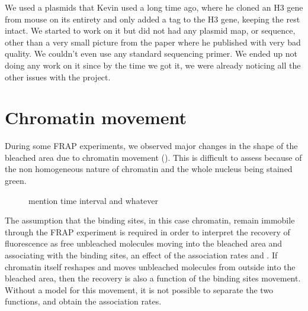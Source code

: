   We used a plasmids that Kevin used a long time ago, where he cloned an H3 gene from mouse on its
  entirety and only added a tag to the H3 gene, keeping the rest intact. We started to work on it but did not had any plasmid map,
  or sequence, other than a very small picture from the paper where he published with very
  bad quality. We couldn't even use any standard sequencing primer. We ended up not doing
  any work on it since by the time we got it, we were already noticing all
  the other issues with the project.

  


\section{Chromatin movement}
  
  During some FRAP experiments, we observed major changes in the shape of the bleached area due to
  chromatin movement (). This is difficult to assess because of the
  non homogeneous nature of chromatin and the whole nucleus being stained green.
  
  \begin{figure}
    \centering
                 {mention time interval and whatever}
    \label{fig:frap-chromatin-movement}
  \end{figure}
  
  The assumption that the binding sites, in this case chromatin, remain immobile through the FRAP experiment is
  required in order to interpret the recovery of fluorescence as free unbleached molecules moving
  into the bleached area and associating with the binding sites, an effect of the association rates \Kon and
  \Koff. If chromatin itself reshapes and moves unbleached molecules from outside into the bleached area, then
  the recovery is also a function of the binding sites movement. Without a model for this movement, it is not
  possible to separate the two functions, and obtain the association rates.
  
